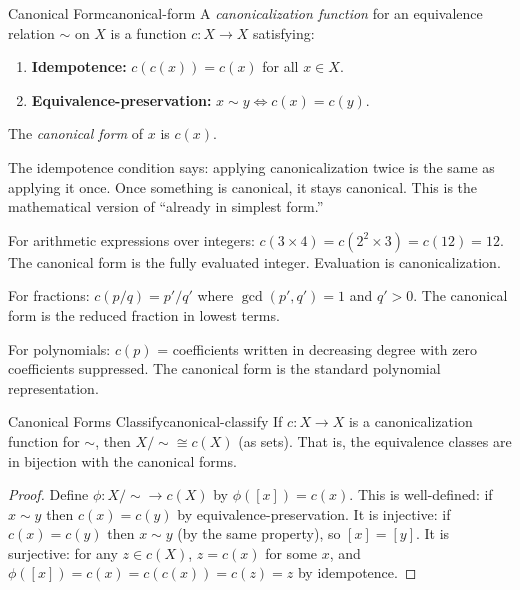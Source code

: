 \begin{definition}{Canonical Form}{canonical-form}
  A \emph{canonicalization function} for an equivalence relation $\sim$
  on $X$ is a function $c : X \to X$ satisfying:
  \begin{enumerate}
    \item \textbf{Idempotence:} $c(c(x)) = c(x)$ for all $x \in X$.
    \item \textbf{Equivalence-preservation:}
          $x \sim y \Leftrightarrow c(x) = c(y)$.
  \end{enumerate}
  The \emph{canonical form} of $x$ is $c(x)$.
\end{definition}

The idempotence condition says: applying canonicalization twice is the same
as applying it once. Once something is canonical, it stays canonical. This
is the mathematical version of ``already in simplest form.''

\begin{example}
  For arithmetic expressions over integers:
  $c(3 \times 4) = c(2^2 \times 3) = c(12) = 12$.
  The canonical form is the fully evaluated integer. Evaluation is
  canonicalization.
\end{example}

\begin{example}
  For fractions: $c(p/q) = p'/q'$ where $\gcd(p',q') = 1$ and $q' > 0$.
  The canonical form is the reduced fraction in lowest terms.
\end{example}

\begin{example}
  For polynomials: $c(p)$ = coefficients written in decreasing degree
  with zero coefficients suppressed. The canonical form is the standard
  polynomial representation.
\end{example}

\begin{theorem}{Canonical Forms Classify}{canonical-classify}
  If $c : X \to X$ is a canonicalization function for $\sim$, then
  $X/{\sim} \cong c(X)$ (as sets). That is, the equivalence classes
  are in bijection with the canonical forms.
\end{theorem}

\begin{proof}
  Define $\phi : X/{\sim} \to c(X)$ by $\phi([x]) = c(x)$.
  This is well-defined: if $x \sim y$ then $c(x) = c(y)$ by
  equivalence-preservation. It is injective: if $c(x) = c(y)$
  then $x \sim y$ (by the same property), so $[x] = [y]$.
  It is surjective: for any $z \in c(X)$, $z = c(x)$ for some $x$,
  and $\phi([x]) = c(x) = c(c(x)) = c(z) = z$ by idempotence.
\end{proof}

